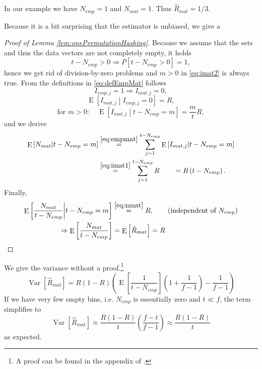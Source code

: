 \documentclass[a4paper]{article}
\DeclareMathOperator{\Var}{Var}
\DeclareMathOperator{\E}{E}
\begin{document}
In our example we have $N_{emp}=1$ and $N_{mat}=1$. Thus $\hat{R}_{mat}=1/3$.

Because it is a bit surprising that the estimator is unbiased, we give a

\begin{proof}[Proof of Lemma \vref{lem:onePermutationHashing}]
Because we assume that the sets and thus the data vectors are not completely empty, it holds
\begin{equation*}
t-N_{emp} > 0 \Rightarrow P\left[ t-N_{emp}>0 \right]=1, 
\end{equation*}
hence we get rid of division-by-zero problems and $m>0$ in \vref{eq:imat2} is always true.
From the definitions in \vref{eq:defEmpMat} follows
\begin{equation}\label{eq:empmat}
I_{emp,j} = 1 \Rightarrow I_{mat,j}=0,
\end{equation}
\begin{equation}\label{eq:imat1}
\E \left[ I_{mat,j} \middle\vert I_{emp,j} = 0 \right] = R,
\end{equation}
\begin{equation}\label{eq:imat2}
\text{for } m > 0: \quad \E \left[ I_{mat,j} \middle\vert t-N_{emp}=m \right] = \frac{m}{t}R,
\end{equation}
and we derive
\begin{equation}\label{eq:nmat}
\begin{split}
\E \left[ N_{mat} \middle\vert t-N_{emp}=m \right] &\overset{\ref{eq:empmat}}{=} \sum_{j=1}^{t-N_{emp}} \E \left[ I_{mat,j} \middle\vert t-N_{emp}=m \right] \\
& \overset{\ref{eq:imat1}}{=} \sum_{j=1}^{t-N_{emp}} R \qquad = R \left( t-N_{emp} \right).
\end{split}
\end{equation}
Finally,
\begin{equation}
\begin{split}
\E \left[ \frac{N_{mat}}{t-N_{emp}} \middle\vert t-N_{emp}=m \right] &  \overset{\ref{eq:nmat}}{=} R, \qquad \text{(independent of $N_{emp}$)} \\
\Rightarrow \E \left[ \frac{N_{mat}}{t-N_{emp}} \right] & \overset{}{=} \E \left[ \hat{R}_{mat} \right] = R
\end{split}
\end{equation}
\end{proof}

We give the variance without a proof.\footnote{A proof can be found in the appendix of \citep{LiOwZhang12}.}
\begin{equation}
\Var \left[ \hat{R}_{mat} \right] = R(1-R) \left( \E \left[ \frac{1}{t-N_{emp}} \right] \left( 1 + \frac{1}{f-1} \right) - \frac{1}{f-1} \right)
\end{equation}
If we have very few empty bins, i.e. $N_{emp}$ is essentially zero and $t \ll f$, the term simplifies to
\begin{equation}
\Var \left[ \hat{R}_{mat} \right] \approx \frac{R(1-R)}{t} \left( \frac{f-t}{f-1} \right) \approx \frac{R(1-R)}{t}
\end{equation}
as expected.
\end{document}
